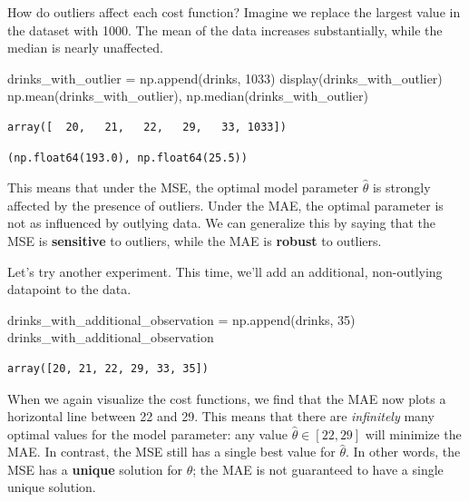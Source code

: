 \documentclass[
  letterpaper,
  DIV=11,
  numbers=noendperiod]{scrreprt}
\newenvironment{Shaded}{\begin{snugshade}}{\end{snugshade}}
\newcommand{\DecValTok}[1]{\textcolor[rgb]{0.68,0.00,0.00}{#1}}
\newcommand{\NormalTok}[1]{\textcolor[rgb]{0.00,0.23,0.31}{#1}}
\newcommand{\OperatorTok}[1]{\textcolor[rgb]{0.37,0.37,0.37}{#1}}
\begin{document}
How do outliers affect each cost function? Imagine we replace the
largest value in the dataset with 1000. The mean of the data increases
substantially, while the median is nearly unaffected.

\begin{Shaded}
\begin{Highlighting}[]
\NormalTok{drinks\_with\_outlier }\OperatorTok{=}\NormalTok{ np.append(drinks, }\DecValTok{1033}\NormalTok{)}
\NormalTok{display(drinks\_with\_outlier)}
\NormalTok{np.mean(drinks\_with\_outlier), np.median(drinks\_with\_outlier)}
\end{Highlighting}
\end{Shaded}

\begin{verbatim}
array([  20,   21,   22,   29,   33, 1033])
\end{verbatim}

\begin{verbatim}
(np.float64(193.0), np.float64(25.5))
\end{verbatim}

This means that under the MSE, the optimal model parameter
\(\hat{\theta}\) is strongly affected by the presence of outliers. Under
the MAE, the optimal parameter is not as influenced by outlying data. We
can generalize this by saying that the MSE is \textbf{sensitive} to
outliers, while the MAE is \textbf{robust} to outliers.

Let's try another experiment. This time, we'll add an additional,
non-outlying datapoint to the data.

\begin{Shaded}
\begin{Highlighting}[]
\NormalTok{drinks\_with\_additional\_observation }\OperatorTok{=}\NormalTok{ np.append(drinks, }\DecValTok{35}\NormalTok{)}
\NormalTok{drinks\_with\_additional\_observation}
\end{Highlighting}
\end{Shaded}

\begin{verbatim}
array([20, 21, 22, 29, 33, 35])
\end{verbatim}

When we again visualize the cost functions, we find that the MAE now
plots a horizontal line between 22 and 29. This means that there are
\emph{infinitely} many optimal values for the model parameter: any value
\(\hat{\theta} \in [22, 29]\) will minimize the MAE. In contrast, the
MSE still has a single best value for \(\hat{\theta}\). In other words,
the MSE has a \textbf{unique} solution for \(\hat{\theta}\); the MAE is
not guaranteed to have a single unique solution.
\end{document}
